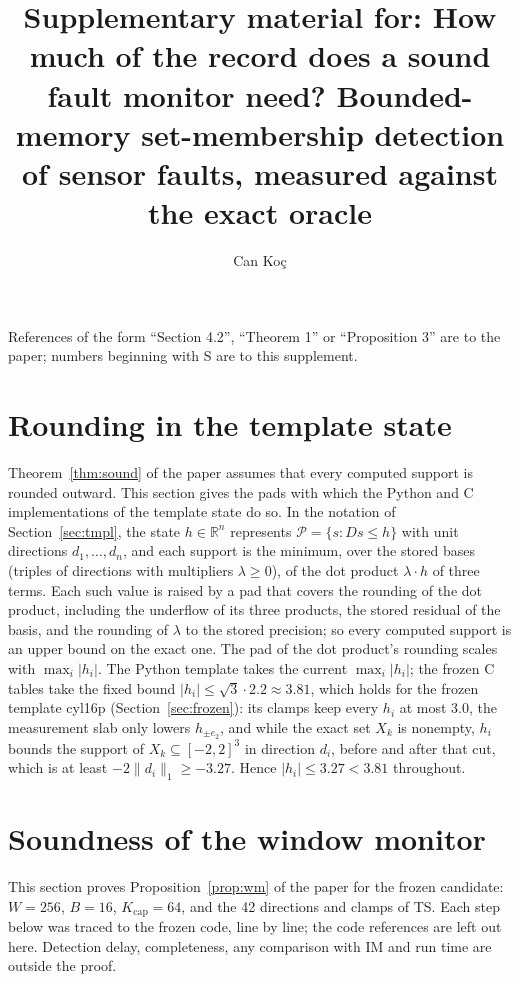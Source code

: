 \documentclass[11pt,a4paper]{article}
\title{Supplementary material for: How much of the record does a sound fault monitor need? Bounded-memory
set-membership detection of sensor faults, measured against the exact oracle}
\author{Can Ko\c{c}}
\date{}
\newcommand{\R}{\mathbb{R}}
\begin{document}
\maketitle

References of the form ``Section 4.2'', ``Theorem 1'' or ``Proposition 3'' are to the paper; numbers beginning with S
are to this supplement.

\section{Rounding in the template state}\label{sup:round}

Theorem~\ref{thm:sound} of the paper assumes that every computed support is rounded outward. This section gives the
pads with which the Python and C implementations of the template state do so. In the notation of Section~\ref{sec:tmpl}, the
state $h\in\R^n$ represents $\mathcal{P} = \{s : Ds\le h\}$ with unit directions $d_1,\dots,d_n$, and each support is
the minimum, over the stored bases (triples of directions with multipliers $\lambda\ge0$), of the dot product
$\lambda\cdot h$ of three terms. Each such value is raised by a pad that covers the rounding of the dot product,
including the underflow of its three products, the stored residual of the basis, and the rounding of $\lambda$ to the
stored precision; so every computed support is an upper bound on the exact one. The pad of the dot product's
rounding scales with $\max_i|h_i|$. The Python template takes the current $\max_i|h_i|$; the frozen C tables take the
fixed bound $|h_i|\le\sqrt3\cdot2.2\approx3.81$, which holds for the frozen template cyl16p (Section~\ref{sec:frozen}): its clamps
keep every $h_i$ at most 3.0, the measurement slab only lowers $h_{\pm e_2}$, and while the exact set $X_k$ is
nonempty, $h_i$ bounds the support of $X_k\subseteq[-2,2]^3$ in direction $d_i$, before and after that cut, which is
at least $-2\|d_i\|_1\ge-3.27$. Hence $|h_i|\le3.27<3.81$ throughout.


\section{Soundness of the window monitor}\label{app:proof}

This section proves Proposition~\ref{prop:wm} of the paper for the frozen candidate: $W = 256$, $B = 16$, $K_{\mathrm{cap}} = 64$,
and the 42 directions and clamps of TS. Each step below was traced to the frozen code, line by line;
the code references are left out here. Detection delay, completeness, any comparison with IM and run time are outside
the proof.
\end{document}
